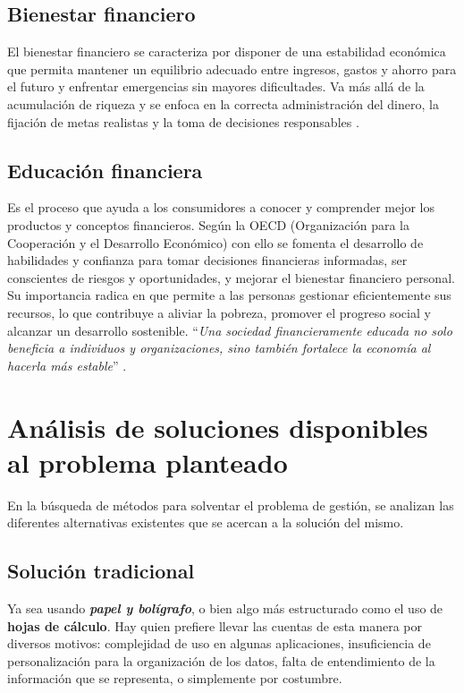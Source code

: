 \subsection*{Bienestar financiero}
El bienestar financiero se caracteriza por disponer de una estabilidad económica que 
permita mantener un equilibrio adecuado entre ingresos, gastos y ahorro para el futuro 
y enfrentar emergencias sin mayores dificultades. Va más allá de la acumulación de 
riqueza y se enfoca en la correcta administración del dinero, la fijación de metas 
realistas y la toma de decisiones responsables \cite{tesis-cultura-financiera}.

\subsection*{Educación financiera}
Es el proceso que ayuda a los consumidores a conocer y 
comprender mejor los productos y conceptos financieros. Según la OECD (Organización para la Cooperación y el Desarrollo Económico) con ello se fomenta el 
desarrollo de habilidades y confianza para tomar decisiones financieras informadas, ser conscientes de riesgos y oportunidades, y mejorar el bienestar financiero personal. Su importancia radica en que permite a las personas gestionar eficientemente sus recursos, lo que contribuye a aliviar la pobreza, promover el progreso social y alcanzar un desarrollo sostenible. ``\textit{Una sociedad financieramente educada no solo beneficia a individuos y organizaciones, sino también fortalece la economía al hacerla más estable}'' \cite{capituloIX}\cite{ariza2024educacion}\cite{sarango2023educacion}.



\section{Análisis de soluciones disponibles al problema planteado}

En la búsqueda de métodos para solventar el problema de gestión, se analizan las diferentes alternativas existentes que se acercan a la solución del mismo.

\subsection{Solución tradicional}
Ya sea usando \textit{\textbf{papel y bolígrafo}}, o bien algo más 
estructurado como el uso de \textbf{hojas de cálculo}. Hay quien prefiere llevar las 
cuentas de esta manera por diversos motivos: complejidad de uso en algunas aplicaciones, 
insuficiencia de personalización para la organización de los datos, falta de entendimiento 
de la información que se representa, o simplemente por costumbre.

